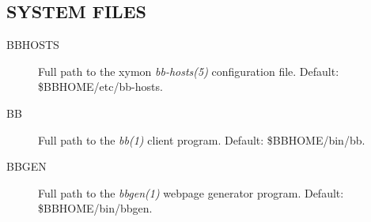 \subsection{SYSTEM FILES}


 \begin{description}
\item[BBHOSTS] Full path to the xymon \emph{bb-hosts(5)}
 configuration file. Default: \$BBHOME/etc/bb-hosts. 

 

\item[BB] Full path to the \emph{bb(1)}
 client program. Default: \$BBHOME/bin/bb. 

 

\item[BBGEN] Full path to the \emph{bbgen(1)}
 webpage generator program. Default: \$BBHOME/bin/bbgen. 

 


 


\end{description}

